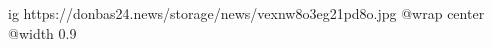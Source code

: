  
 
 
 
 

\ifcmt
  ig https://donbas24.news/storage/news/vexnw8o3eg21pd8o.jpg
  @wrap center
  @width 0.9
\fi
